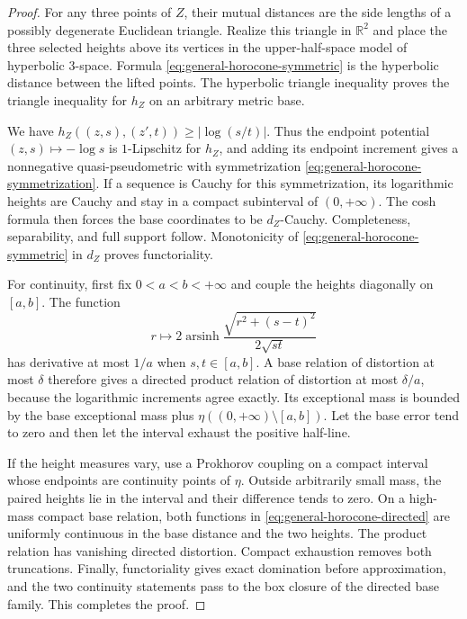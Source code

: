 \documentclass[10pt,a4paper]{amsart}
\numberwithin{equation}{section}
\newcommand{\R}{\mathbb R}
\DeclareMathOperator{\arsinh}{arsinh}
\begin{document}
\begin{proof}
For any three points of $Z$, their mutual distances are the side lengths of a possibly degenerate Euclidean triangle.  Realize this triangle in $\R^2$ and place the three selected heights above its vertices in the upper-half-space model of hyperbolic $3$-space.  Formula \eqref{eq:general-horocone-symmetric} is the hyperbolic distance between the lifted points.  The hyperbolic triangle inequality proves the triangle inequality for $h_Z$ on an arbitrary metric base.

We have $h_Z((z,s),(z',t))\ge|\log(s/t)|$.  Thus the endpoint potential $(z,s)\mapsto-\log s$ is $1$-Lipschitz for $h_Z$, and adding its endpoint increment gives a nonnegative quasi-pseudometric with symmetrization \eqref{eq:general-horocone-symmetrization}.  If a sequence is Cauchy for this symmetrization, its logarithmic heights are Cauchy and stay in a compact subinterval of $(0,+\infty)$.  The cosh formula then forces the base coordinates to be $d_Z$-Cauchy.  Completeness, separability, and full support follow.  Monotonicity of \eqref{eq:general-horocone-symmetric} in $d_Z$ proves functoriality.

For continuity, first fix $0<a<b<+\infty$ and couple the heights diagonally on $[a,b]$.  The function
\[ r\longmapsto2\arsinh \frac{\sqrt{r^2+(s-t)^2}}{2\sqrt{st}} \]
has derivative at most $1/a$ when $s,t\in[a,b]$.  A base relation of distortion at most $\delta$ therefore gives a directed product relation of distortion at most $\delta/a$, because the logarithmic increments agree exactly.  Its exceptional mass is bounded by the base exceptional mass plus $\eta((0,+\infty)\setminus[a,b])$.  Let the base error tend to zero and then let the interval exhaust the positive half-line.

If the height measures vary, use a Prokhorov coupling on a compact interval whose endpoints are continuity points of $\eta$.  Outside arbitrarily small mass, the paired heights lie in the interval and their difference tends to zero.  On a high-mass compact base relation, both functions in \eqref{eq:general-horocone-directed} are uniformly continuous in the base distance and the two heights.  The product relation has vanishing directed distortion.  Compact exhaustion removes both truncations.  Finally, functoriality gives exact domination before approximation, and the two continuity statements pass to the box closure of the directed base family.  This completes the proof.
\end{proof}
\end{document}
